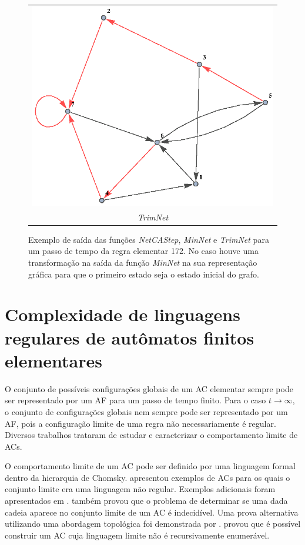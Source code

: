 \documentclass[12pt,a4paper]{article}
\begin{document}
\begin{center}
\begin{figure}[htp]
\begin{tabular}{c}
\includegraphics[scale=1.0]{img/TrimNet.eps} \\
\emph{TrimNet} \\
\end{tabular}
\caption[Exemplo de saída das funções \emph{NetCAStep}, \emph{MinNet} e
\emph{TrimNet}]
{Exemplo de saída das funções \emph{NetCAStep}, \emph{MinNet} e
\emph{TrimNet} para um passo de tempo da regra elementar 172. No caso
houve uma transformação na saída da função \emph{MinNet} na sua representação
gráfica para que o primeiro estado seja o estado inicial do grafo.}
\label{fig:wfexample}
\end{figure}
\end{center}

\newpage

\section{Complexidade de linguagens regulares de autômatos
finitos elementares}\label{sec:complexity}

O conjunto de possíveis configurações globais de um AC elementar sempre
pode ser representado por um AF para um passo de tempo finito. Para
o caso $t \rightarrow \infty$, o conjunto de configurações globais nem
sempre pode ser representado por um AF, pois a configuração limite de
uma regra não necessariamente é regular. Diversos trabalhos trataram
de estudar e caracterizar o comportamento limite de ACs.

O comportamento limite de um AC pode ser definido por uma linguagem
formal dentro da hierarquia de Chomsky.  apresentou
exemplos de ACs para os quais o conjunto limite era uma linguagem não
regular. Exemplos adicionais foram apresentados em .
 também provou que o problema de determinar se uma
dada cadeia aparece no conjunto limite de um AC é indecidível.
Uma prova alternativa utilizando uma abordagem topológica foi demonstrada
por .   provou que é possível
construir um AC cuja linguagem limite não é recursivamente enumerável.
\end{document}
